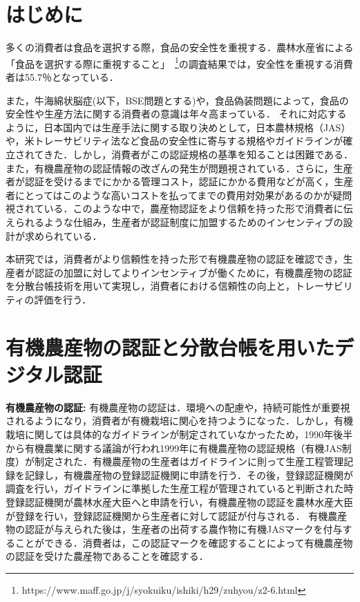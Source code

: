 \documentclass[twocolumn]{jarticle} %
\begin{document}
\maketitle
\thispagestyle{empty} %



\section{はじめに}

多くの消費者は食品を選択する際，食品の安全性を重視する．農林水産省による「食品を選択する際に重視すること」~\footnote[1]{https://www.maff.go.jp/j/syokuiku/ishiki/h29/zuhyou/z2-6.html}の調査結果では，安全性を重視する消費者は55.7％となっている．

また，牛海綿状脳症(以下，BSE問題とする)や，食品偽装問題によって，食品の安全性や生産方法に関する消費者の意識は年々高まっている．
それに対応するように，日本国内では生産手法に関する取り決めとして，日本農林規格（JAS）や，米トレーサビリティ法など食品の安全性に寄与する規格やガイドラインが確立されてきた．しかし，消費者がこの認証規格の基準を知ることは困難である．また，有機農産物の認証情報の改ざんの発生が問題視されている．さらに，生産者が認証を受けるまでにかかる管理コスト，認証にかかる費用などが高く，生産者にとってはこのような高いコストを払ってまでの費用対効果があるのかが疑問視されている．このような中で，農産物認証をより信頼を持った形で消費者に伝えられるような仕組み，生産者が認証制度に加盟するためのインセンティブの設計が求められている．

本研究では，消費者がより信頼性を持った形で有機農産物の認証を確認でき，生産者が認証の加盟に対してよりインセンティブが働くために，有機農産物の認証を分散台帳技術を用いて実現し，消費者における信頼性の向上と，トレーサビリティの評価を行う．

\section{有機農産物の認証と分散台帳を用いたデジタル認証}

\noindent\textbf{有機農産物の認証: }有機農産物の認証は．環境への配慮や，持続可能性が重要視されるようになり，消費者が有機栽培に関心を持つようになった．しかし，有機栽培に関しては具体的なガイドラインが制定されていなかったため，1990年後半から有機農業に関する議論が行われ1999年に有機農産物の認証規格（有機JAS制度）が制定された．有機農産物の生産者はガイドラインに則って生産工程管理記録を記録し，有機農産物の登録認証機関に申請を行う．その後，登録認証機関が調査を行い，ガイドラインに準拠した生産工程が管理されていると判断された時登録認証機関が農林水産大臣へと申請を行い，有機農産物の認証を農林水産大臣が登録を行い，登録認証機関から生産者に対して認証が付与される．
有機農産物の認証が与えられた後は，生産者の出荷する農作物に有機JASマークを付与することができる．消費者は，この認証マークを確認することによって有機農産物の認証を受けた農産物であることを確認する．
\end{document}
